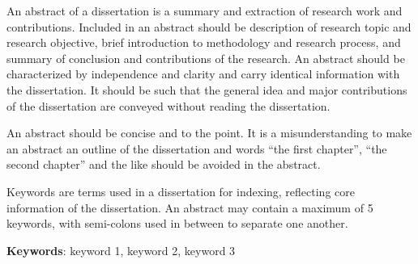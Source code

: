 \newpage
\begin{center}
    \fontsize{18}{1}
\end{center}
\begin{tcolorbox}
\begin{center}
    \fontsize{14}{0}
\end{center}
\vspace{8mm}
\noindent
{\fontsize{16}{0}}
\vspace{2mm}

\setlength{\parindent}{24pt}
  An abstract of a dissertation is a summary and extraction of research work and contributions.
  Included in an abstract should be description of research topic and research objective, brief introduction to methodology and research process, and summary of conclusion and contributions of the research.
  An abstract should be characterized by independence and clarity and carry identical information with the dissertation.
  It should be such that the general idea and major contributions of the dissertation are conveyed without reading the dissertation.

  An abstract should be concise and to the point.
  It is a misunderstanding to make an abstract an outline of the dissertation and words “the first chapter”, “the second chapter” and the like should be avoided in the abstract.

  Keywords are terms used in a dissertation for indexing, reflecting core information of the dissertation.
  An abstract may contain a maximum of 5 keywords, with semi-colons used in between to separate one another.
\vspace{8mm}

\noindent\textbf{Keywords}: keyword 1, keyword 2, keyword 3
\end{tcolorbox}

\setlength{\parindent}{24pt}

